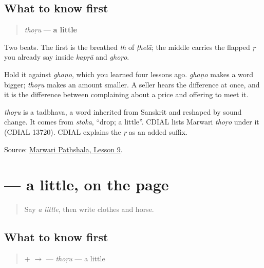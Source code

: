 \subsection*{What to know first}
\begin{quote}
\emph{thoṛu} — \textbf{a little}
\end{quote}

Two beats. The first is the breathed \emph{th} of \emph{ṭhelā}; the middle carries the flapped \emph{ṛ} you already say inside \emph{kapṛā} and \emph{ghoṛo}.

Hold it against \emph{ghaṇo}, which you learned four lessons ago. \emph{ghaṇo} makes a word bigger; \emph{thoṛu} makes an amount smaller. A seller hears the difference at once, and it is the difference between complaining about a price and offering to meet it.

\begin{cousinweb}
\emph{thoṛu} is a tadbhava, a word inherited from Sanskrit and reshaped by sound change. It comes from \emph{stoka}, \textquotedblleft{}drop; a little\textquotedblright{}. CDIAL lists Marwari \emph{thoṛo} under it (CDIAL 13720). CDIAL explains the \emph{ṛ} as an added suffix.
\end{cousinweb}

\begin{tcolorbox}[breakable,colback=teal!4,colframe=teal!35!black,title={Before you move on}]
Source: \href{https://www.marwaripathshala.com/marwari-lesson-9-english}{Marwari Pathshala, Lesson 9}.
\end{tcolorbox}
\section[\texorpdfstring{\mw{थोड़ु} (thoṛu)}{थोड़ु (thoṛu)}]{ — a little, on the page}

\label{lesson:MW-C23-thodu}



\begin{quote}
Say \emph{a little}, then write clothes and horse.
\end{quote}

\subsection*{What to know first}
\begin{quote}
\textbf{} + \textbf{} $\to$ \textbf{} — \emph{thoṛu} — a little
\end{quote}

